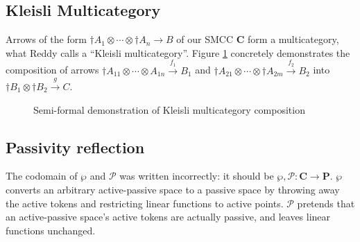 \documentclass{article}
\newcommand{\mbf}{\mathbf}
\begin{document}
\subsection*{Kleisli Multicategory}

Arrows of the form $\dagger A_1 \otimes \cdots \otimes \dagger A_n \to B$ of our SMCC $\mbf{C}$ form a multicategory, what Reddy calls a ``Kleisli multicategory''. Figure \ref{fig:multicomp} concretely demonstrates the composition of arrows $\dagger A_{11} \otimes \cdots \otimes A_{1n} \overset{f_1}{\to} B_1$ and $\dagger A_{21} \otimes \cdots \otimes \dagger A_{2m} \overset{f_2}{\to} B_2$ into $\dagger B_1 \otimes \dagger B_2 \overset{g}{\to} C$.

\begin{figure}
\caption{Semi-formal demonstration of Kleisli multicategory composition}
\label{fig:multicomp}
\end{figure}

\subsection*{Passivity reflection}

The codomain of $\wp$ and $\mathcal P$ was written incorrectly: it should be $\wp, \mathcal P : \mbf{C} \to \mbf{P}$. $\wp$ converts an arbitrary
active-passive space to a passive space by throwing away the active tokens and restricting linear functions to active points. $\mathcal P$ pretends that an active-passive space's active tokens are actually passive, and leaves linear functions unchanged.
\end{document}
